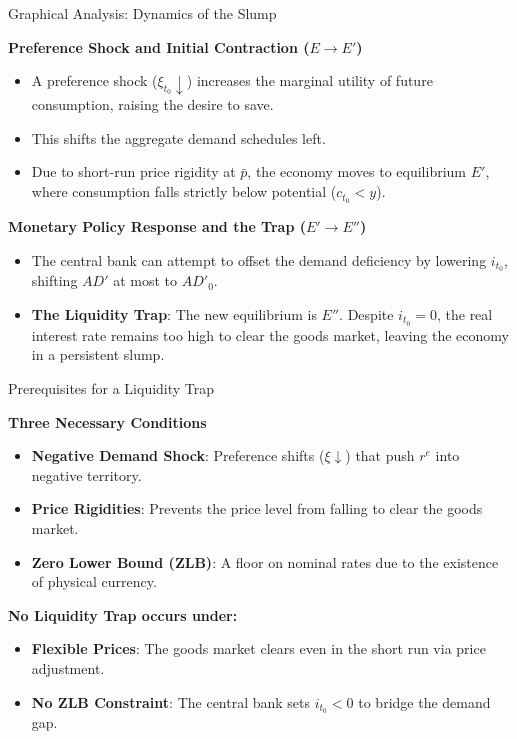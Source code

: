 \documentclass[11pt,aspectratio=169]{beamer}
\begin{document}
\begin{frame}{Graphical Analysis: Dynamics of the Slump}
\small

\textbf{Preference Shock and Initial Contraction ($E \to E'$)}
\begin{itemize}
    \item A preference shock ($\xi_{t_0} \downarrow$) increases the marginal utility of future consumption, raising the desire to save.
    \item This shifts the aggregate demand schedules left.
    \item Due to short-run price rigidity at $\bar{p}$, the economy moves to equilibrium $E'$, where consumption falls strictly below potential ($c_{t_0} < y$).
\end{itemize}

\vspace{0.4cm}

\textbf{Monetary Policy Response and the Trap ($E' \to E''$)}
\begin{itemize}
    \item The central bank  can attempt to offset the demand deficiency by lowering $i_{t_0}$, shifting $AD'$ at most to $AD'_0$.
    \item \textbf{The Liquidity Trap}: The new equilibrium is $E''$. Despite $i_{t_0} = 0$, the real interest rate remains too high to clear the goods market, leaving the economy in a persistent slump.
\end{itemize}

\end{frame}

\begin{frame}{Prerequisites for a Liquidity Trap}
\small

\textbf{Three Necessary Conditions}
\begin{itemize}
    \item \textbf{Negative Demand Shock}: Preference shifts ($\xi \downarrow$) that push $r^e$ into negative territory.
    \item \textbf{Price Rigidities}: Prevents the price level from falling to clear the goods market.
    \item \textbf{Zero Lower Bound (ZLB)}: A floor on nominal rates due to the existence of physical currency.
\end{itemize}

\vspace{0.4cm}

\textbf{No Liquidity Trap occurs under:}
\begin{itemize}
    \item \textbf{Flexible Prices}: The goods market clears even in the short run via price adjustment.
    \item \textbf{No ZLB Constraint}: The central bank  sets $i_{t_0} < 0$ to bridge the demand gap.
\end{itemize}

\end{frame}
\end{document}
